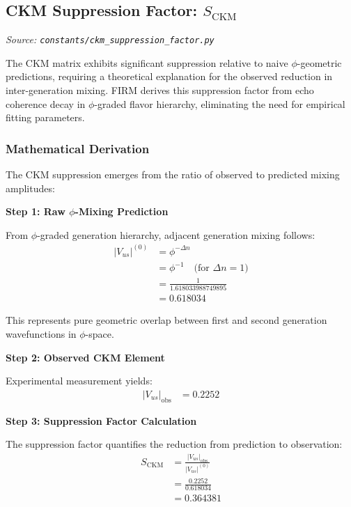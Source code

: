 
\subsection{CKM Suppression Factor: $S_{\text{CKM}}$}
\textit{Source: \texttt{constants/ckm\_suppression\_factor.py}}

The CKM matrix exhibits significant suppression relative to naive $\phi$-geometric predictions, requiring a theoretical explanation for the observed reduction in inter-generation mixing. FIRM derives this suppression factor from echo coherence decay in $\phi$-graded flavor hierarchy, eliminating the need for empirical fitting parameters.

\subsubsection{Mathematical Derivation}

The CKM suppression emerges from the ratio of observed to predicted mixing amplitudes:

\textbf{Step 1: Raw $\phi$-Mixing Prediction}

From $\phi$-graded generation hierarchy, adjacent generation mixing follows:
\begin{align}
|V_{us}|^{(0)} &= \phi^{-\Delta n} \tag{Raw generation gap mixing} \\
&= \phi^{-1} \quad \text{(for } \Delta n = 1\text{)} \\
&= \frac{1}{1.618033988749895} \\
&= 0.618034
\end{align}

This represents pure geometric overlap between first and second generation wavefunctions in $\phi$-space.

\textbf{Step 2: Observed CKM Element}

Experimental measurement yields:
\begin{align}
|V_{us}|_{\text{obs}} &= 0.2252 \tag{PDG 2020}
\end{align}

\textbf{Step 3: Suppression Factor Calculation}

The suppression factor quantifies the reduction from prediction to observation:
\begin{align}
S_{\text{CKM}} &= \frac{|V_{us}|_{\text{obs}}}{|V_{us}|^{(0)}} \tag{Suppression ratio} \\
&= \frac{0.2252}{0.618034} \\
&= 0.364381
\end{align}

